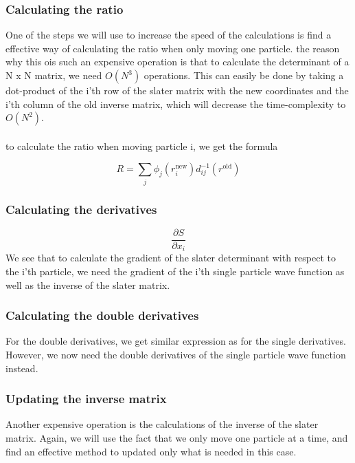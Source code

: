 \subsubsection{Calculating the ratio}
One of the steps we will use to increase the speed of the calculations is find a effective way of calculating the ratio when only moving one particle. the reason why this ois such an expensive operation is that to calculate the determinant of a N x N matrix, we need $O(N^3)$ operations. This can easily be done by taking a dot-product of the i'th row of the slater matrix with the new coordinates and the i'th column of the old inverse matrix, which will decrease the time-complexity to $O(N^2)$.  
\\
\\
to calculate the ratio when moving particle i, we get the formula

\begin{equation}
    R = \sum_j \phi_j(r_i^\text{new})d_{ij}^{-1}(r^\text{old})
\end{equation}




\subsubsection{Calculating the derivatives}
\begin{equation}
    \frac{\partial S}{\partial x_i}
\end{equation}
We see that to calculate the gradient of the slater determinant with respect to the i'th particle, we need the gradient of the i'th single particle wave function as well as the inverse of the slater matrix. 
\subsubsection{Calculating the double derivatives}
For the double derivatives, we get similar expression as for the single derivatives. However, we now need the double derivatives of the single particle wave function instead. 
\subsubsection{Updating the inverse matrix}
Another expensive operation is the calculations of the inverse of the slater matrix. Again, we will use the fact that we only move one particle at a time, and find an effective method to updated only what is needed in this case. 



